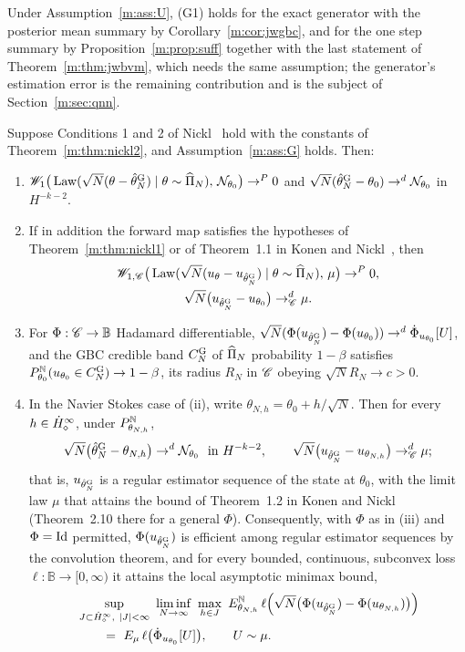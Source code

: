 Under Assumption~\ref{m:ass:U}, (G1) holds for the exact generator with the posterior mean summary by Corollary~\ref{m:cor:jwgbc}, and for the one step summary by Proposition~\ref{m:prop:suff} together with the last statement of Theorem~\ref{m:thm:jwbvm}, which needs the same assumption; the generator's estimation error is the remaining contribution and is the subject of Section~\ref{m:sec:qnn}.

\begin{theorem}\label{m:thm:main}
Suppose Conditions 1 and 2 of Nickl~\cite{nicklbvm2024} hold with the constants of Theorem~\ref{m:thm:nickl2}, and Assumption~\ref{m:ass:G} holds. Then:
\begin{enumerate}[label=(\roman*),nosep]
\item $\mathscr{W}_1\big(\operatorname{Law}(\sqrt N(\theta-\hat\theta_N^{\rm G})\mid\theta\sim\widehat\Pi_N),\,\mathcal{N}_{\theta_0}\big)\to^{P}0$ and $\sqrt N(\hat\theta_N^{\rm G}-\theta_0)\to^d\mathcal{N}_{\theta_0}$ in $H^{-k-2}$.
\item If in addition the forward map satisfies the hypotheses of Theorem~\ref{m:thm:nickl1} or of Theorem~1.1 in Konen and Nickl~\cite{konennickl2026}, then
\[
\begin{gathered}
\mathscr{W}_{1,\mathscr{C}}\big(\operatorname{Law}(\sqrt N(u_\theta-u_{\hat\theta_N^{\rm G}})\mid\theta\sim\widehat\Pi_N),\,\mu\big)\to^P0,\\
\sqrt N\big(u_{\hat\theta_N^{\rm G}}-u_{\theta_0}\big)\to^d_{\mathscr{C}}\mu .
\end{gathered}
\]
\item For $\Phi:\mathscr{C}\to\mathbb B$ Hadamard differentiable, $\sqrt N(\Phi(u_{\hat\theta_N^{\rm G}})-\Phi(u_{\theta_0}))\to^d\dot\Phi_{u_{\theta_0}}[U]$, and the GBC credible band $C^{\rm G}_N$ of $\widehat\Pi_N$ probability $1-\beta$ satisfies $P^{\mathbb{N}}_{\theta_0}(u_{\theta_0}\in C^{\rm G}_N)\to1-\beta$, its radius $R_N$ in $\mathscr{C}$ obeying $\sqrt NR_N\to c>0$.
\item In the Navier Stokes case of (ii), write $\theta_{N,h}=\theta_0+h/\sqrt N$. Then for every $h\in\dot H^{\infty}_\diamond$, under $P^{\mathbb{N}}_{\theta_{N,h}}$,
\[
\sqrt N\big(\hat\theta^{\rm G}_N-\theta_{N,h}\big)\to^d\mathcal{N}_{\theta_0}\ \text{ in }H^{-k-2},\qquad \sqrt N\big(u_{\hat\theta^{\rm G}_N}-u_{\theta_{N,h}}\big)\to^d_{\mathscr{C}}\mu ;
\]
that is, $u_{\hat\theta^{\rm G}_N}$ is a regular estimator sequence of the state at $\theta_0$, with the limit law $\mu$ that attains the bound of Theorem~1.2 in Konen and Nickl~\cite{konennickl2026} (Theorem~2.10 there for a general $\Phi$). Consequently, with $\Phi$ as in (iii) and $\Phi=\operatorname{Id}$ permitted, $\Phi(u_{\hat\theta^{\rm G}_N})$ is efficient among regular estimator sequences by the convolution theorem, and for every bounded, continuous, subconvex loss $\ell:\mathbb B\to[0,\infty)$ it attains the local asymptotic minimax bound,
\[
\begin{aligned}
&\sup_{J\subset\Hds\infty,\ |J|<\infty}\ \liminf_{N\to\infty}\ \max_{h\in J}\ E^\N_{\theta_{N,h}}\,\ell\Big(\sqrt N\big(\Phi(u_{\hat\theta^{\rm G}_N})-\Phi(u_{\theta_{N,h}})\big)\Big)\\
&\qquad=\ E_\mu\,\ell\big(\dot\Phi_{u_{\theta_0}}[U]\big),\qquad U\sim\mu .
\end{aligned}
\]
\end{enumerate}
\end{theorem}

